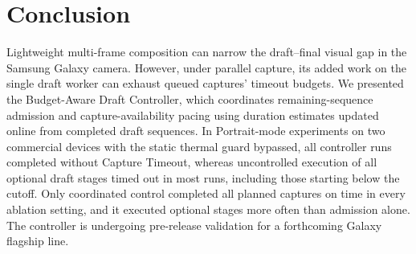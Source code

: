 \section{Conclusion}
\label{sec:conclusion}

Lightweight multi-frame composition can narrow the draft--final visual gap in the Samsung Galaxy camera.
However, under parallel capture, its added work on the single draft worker can exhaust queued captures' timeout budgets.
We presented the Budget-Aware Draft Controller, which coordinates remaining-sequence admission and capture-availability pacing using duration estimates updated online from completed draft sequences.
In Portrait-mode experiments on two commercial devices with the static thermal guard bypassed, all controller runs completed without Capture Timeout, whereas uncontrolled execution of all optional draft stages timed out in most runs, including those starting below the cutoff.
Only coordinated control completed all planned captures on time in every ablation setting, and it executed optional stages more often than admission alone.
The controller is undergoing pre-release validation for a forthcoming Galaxy flagship line.
